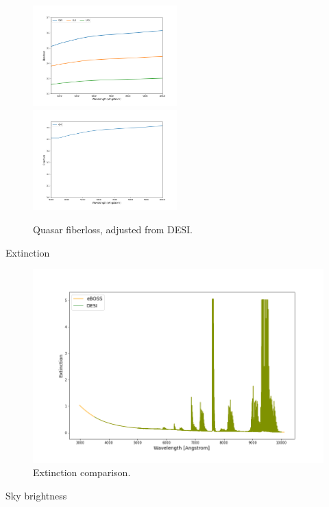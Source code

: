 \begin{figure}[h]
    \centering
    \includegraphics[width=0.495\textwidth]{images/specsim/desimodel-fiberloss.png}
    \includegraphics[width=0.495\textwidth]{images/specsim/fiberloss_qso.png}
    \caption{Quasar fiberloss, adjusted from DESI.}
    \label{fig:qso_fiberloss}
\end{figure}


Extinction

\begin{figure}[h]
\centering
\includegraphics[width=12cm]{images/specsim/extinction.png}
\caption{Extinction comparison.}
\label{fig:extinction}
\end{figure}

Sky brightness

